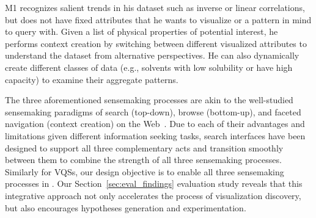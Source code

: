     M1 recognizes salient trends in his dataset such as inverse or linear correlations, but does not have fixed attributes that he wants to visualize or a pattern in mind to query with. Given a list of physical properties of potential interest, he performs context creation by switching between different visualized attributes to understand the dataset from alternative perspectives. He can also dynamically create different classes of data (e.g., solvents with low solubility or have high capacity) to examine their aggregate patterns.
   \par The three aforementioned sensemaking processes are akin to the well-studied sensemaking paradigms of search (top-down), browse (bottom-up), and faceted navigation (context creation) on the Web~\cite{Hearst2009,Olston2003}. Due to each of their advantages and limitations given different information seeking tasks, search interfaces have been designed to support all three complementary acts and transition smoothly between them to combine the strength of all three sensemaking processes. Similarly for VQSs, our design objective is to enable all three sensemaking processes in \zvpp. Our Section~\ref{sec:eval_findings} evaluation study reveals that this integrative approach not only accelerates the process of visualization discovery, but also encourages hypotheses generation and experimentation.
